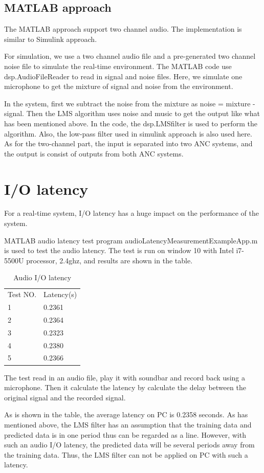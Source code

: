 \documentclass[conference,compsoc]{IEEEtran}
\begin{document}
\subsection{MATLAB approach}
The MATLAB approach support two channel audio. The implementation is similar to Simulink approach.
\par
For simulation, we use a two channel audio file and a pre-generated two channel noise file to simulate the real-time environment. The MATLAB code use dsp.AudioFileReader to read in signal and noise files. Here, we simulate one microphone to get the mixture of signal and noise from the environment. 
\par
In the system, first we subtract the noise from the mixture as noise = mixture - signal. Then the LMS algorithm uses noise and music to get the output like what has been mentioned above. In the code, the dsp.LMSfilter is used to perform the algorithm. Also, the low-pass filter used in simulink approach is also used here.
As for the two-channel part, the input is separated into two ANC systems, and the output is consist of outputs from both ANC systems.

\section{I/O latency}
For a real-time system, I/O latency has a huge impact on the performance of the system.
\par
MATLAB audio latency test program audioLatencyMeasurementExampleApp.m is used to test the audio latency. The test is run on window 10 with Intel i7-5500U processor, 2.4ghz, and results are shown in the table. 
\par

\begin{table}[latency]
\centering
\caption{Audio I/O latency}
\label{my-label}
\begin{tabular}{ll}
Test NO. & Latency(s) \\
1        & 0.2361     \\
2        & 0.2364     \\
3        & 0.2323     \\
4        & 0.2380     \\
5        & 0.2366    
\end{tabular}
\end{table}

The test read in an audio file, play it with soundbar and record back using a microphone. Then it calculate the latency by calculate the delay between the original signal and the recorded signal.
\par
As is shown in the table, the average latency on PC is 0.2358 seconds. As has mentioned above, the LMS filter has an assumption that the training data and predicted data is in one period thus can be regarded as a line. However, with such an audio I/O latency, the predicted data will be several periods away from the training data. Thus, the LMS filter can not be applied on PC with such a latency. 
\end{document}
